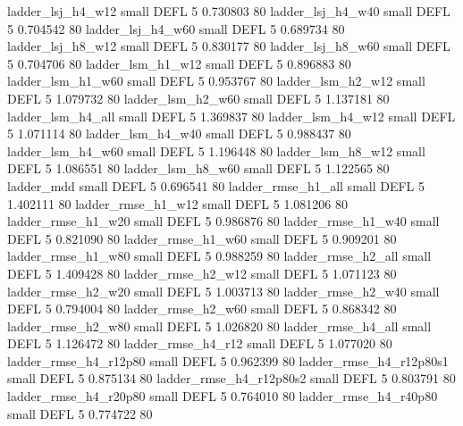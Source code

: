        ladder_lsj_h4_w12      small     DEFL                 5 0.730803 80
       ladder_lsj_h4_w40      small     DEFL                 5 0.704542 80
       ladder_lsj_h4_w60      small     DEFL                 5 0.689734 80
       ladder_lsj_h8_w12      small     DEFL                 5 0.830177 80
       ladder_lsj_h8_w60      small     DEFL                 5 0.704706 80
       ladder_lsm_h1_w12      small     DEFL                 5 0.896883 80
       ladder_lsm_h1_w60      small     DEFL                 5 0.953767 80
       ladder_lsm_h2_w12      small     DEFL                 5 1.079732 80
       ladder_lsm_h2_w60      small     DEFL                 5 1.137181 80
       ladder_lsm_h4_all      small     DEFL                 5 1.369837 80
       ladder_lsm_h4_w12      small     DEFL                 5 1.071114 80
       ladder_lsm_h4_w40      small     DEFL                 5 0.988437 80
       ladder_lsm_h4_w60      small     DEFL                 5 1.196448 80
       ladder_lsm_h8_w12      small     DEFL                 5 1.086551 80
       ladder_lsm_h8_w60      small     DEFL                 5 1.122565 80
              ladder_mdd      small     DEFL                 5 0.696541 80
      ladder_rmse_h1_all      small     DEFL                 5 1.402111 80
      ladder_rmse_h1_w12      small     DEFL                 5 1.081206 80
      ladder_rmse_h1_w20      small     DEFL                 5 0.986876 80
      ladder_rmse_h1_w40      small     DEFL                 5 0.821090 80
      ladder_rmse_h1_w60      small     DEFL                 5 0.909201 80
      ladder_rmse_h1_w80      small     DEFL                 5 0.988259 80
      ladder_rmse_h2_all      small     DEFL                 5 1.409428 80
      ladder_rmse_h2_w12      small     DEFL                 5 1.071123 80
      ladder_rmse_h2_w20      small     DEFL                 5 1.003713 80
      ladder_rmse_h2_w40      small     DEFL                 5 0.794004 80
      ladder_rmse_h2_w60      small     DEFL                 5 0.868342 80
      ladder_rmse_h2_w80      small     DEFL                 5 1.026820 80
      ladder_rmse_h4_all      small     DEFL                 5 1.126472 80
      ladder_rmse_h4_r12      small     DEFL                 5 1.077020 80
   ladder_rmse_h4_r12p80      small     DEFL                 5 0.962399 80
 ladder_rmse_h4_r12p80s1      small     DEFL                 5 0.875134 80
 ladder_rmse_h4_r12p80s2      small     DEFL                 5 0.803791 80
   ladder_rmse_h4_r20p80      small     DEFL                 5 0.764010 80
   ladder_rmse_h4_r40p80      small     DEFL                 5 0.774722 80
